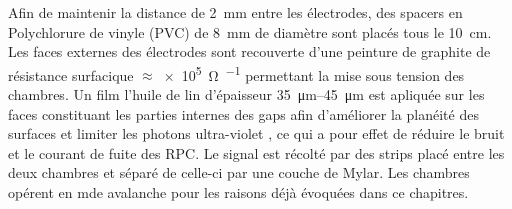 Afin de maintenir la distance de \SI{2}{\milli\meter} entre les électrodes, des spacers en Polychlorure de vinyle (PVC) de \SI{8}{\milli\meter} de diamètre sont placés tous le \SI{10}{\centi\meter}. Les faces externes des électrodes sont recouverte d'une peinture de graphite de résistance surfacique $\approx$\SI{e5}{\ohm\per\sq} permettant la mise sous tension des chambres. Un film l'huile de lin d'épaisseur \SIrange{35}{45}{\micro\meter} est apliquée sur les faces constituant les parties internes des gaps afin d'améliorer la planéité des surfaces \cite{oil} et limiter les photons ultra-violet \cite{Lu:2009zzd}, ce qui a pour effet  de réduire le bruit et le courant de fuite des RPC.
Le signal est récolté par des strips placé entre les deux chambres et séparé de celle-ci par une couche de Mylar. Les chambres opérent en mde avalanche pour les raisons déjà évoquées dans ce chapitres.

